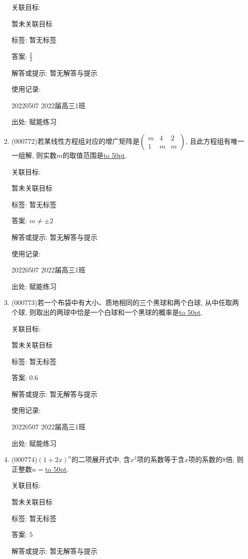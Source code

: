 \documentclass[10pt,a4paper]{article}
\newcommand{\blank}[1]{\underline{\hbox to #1pt{}}}
\begin{document}
\begin{enumerate}[1.]
关联目标:

暂未关联目标



标签: 暂无标签

答案: $\frac 23$

解答或提示: 暂无解答与提示

使用记录:

20220507	2022届高三1班	


出处: 赋能练习
\item { (000772)}若某线性方程组对应的增广矩阵是$\begin{pmatrix} m & 4 & 2 \\ 1 & m & m \end{pmatrix}$, 且此方程组有唯一一组解, 则实数$m$的取值范围是\blank{50}.


关联目标:

暂未关联目标



标签: 暂无标签

答案: $m\ne\pm 2$

解答或提示: 暂无解答与提示

使用记录:

20220507	2022届高三1班	


出处: 赋能练习
\item { (000773)}若一个布袋中有大小、质地相同的三个黑球和两个白球, 从中任取两个球, 则取出的两球中恰是一个白球和一个黑球的概率是\blank{50}.


关联目标:

暂未关联目标



标签: 暂无标签

答案: $0.6$

解答或提示: 暂无解答与提示

使用记录:

20220507	2022届高三1班	


出处: 赋能练习
\item { (000774)}$(1+2x)^n$的二项展开式中, 含$x^3$项的系数等于含$x$项的系数的$8$倍, 则正整数$n=$\blank{50}.


关联目标:

暂未关联目标



标签: 暂无标签

答案: $5$

解答或提示: 暂无解答与提示


\end{enumerate}
\end{document}
